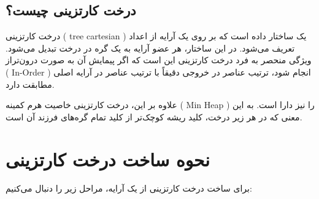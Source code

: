 \documentclass{article}
\begin{document}
\subsection{درخت کارتزینی چیست؟}
درخت کارتزینی ( tree cartesian ) یک ساختار داده است که بر روی یک آرایه از اعداد تعریف می‌شود. در این ساختار، هر عضو آرایه به یک گره در درخت تبدیل می‌شود. ویژگی منحصر به فرد درخت کارتزینی این است که اگر پیمایش آن به صورت درون‌تراز ( In-Order ) انجام شود، ترتیب عناصر در خروجی دقیقاً با ترتیب عناصر در آرایه اصلی مطابقت دارد.

علاوه بر این، درخت کارتزینی خاصیت هرم کمینه ( Min Heap ) را نیز دارا است. به این معنی که در هر زیر درخت، کلید ریشه کوچک‌تر از کلید تمام گره‌های فرزند آن است.
\section{نحوه ساخت درخت کارتزینی}
برای ساخت درخت کارتزینی از یک آرایه، مراحل زیر را دنبال می‌کنیم:
\end{document}
